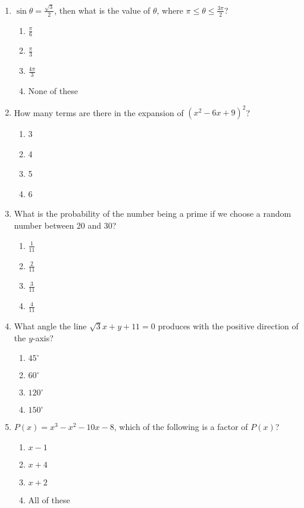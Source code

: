 \documentclass[12pt]{article}
\begin{document}
\begin{enumerate}
    \item $\sin\theta = \frac{\sqrt{3}}{2}$, then what is the value of $\theta$, where $\pi \leq \theta \leq \frac{3\pi}{2}$?
    \begin{enumerate}
        \item $\frac{\pi}{6}$
        \item $\frac{\pi}{3}$
        \item $\frac{4\pi}{3}$
        \item None of these
    \end{enumerate}

    \item How many terms are there in the expansion of $(x^2 - 6x + 9)^2$?
    \begin{enumerate}
        \item 3
        \item 4
        \item 5
        \item 6
    \end{enumerate}

    \item What is the probability of the number being a prime if we choose a random number between 20 and 30?
    \begin{enumerate}
        \item $\frac{1}{11}$
        \item $\frac{2}{11}$
        \item $\frac{3}{11}$
        \item $\frac{4}{11}$
    \end{enumerate}

    \item What angle the line $\sqrt{3}x + y + 11 = 0$ produces with the positive direction of the $y$-axis?
    \begin{enumerate}
        \item $45^\circ$
        \item $60^\circ$
        \item $120^\circ$
        \item $150^\circ$
    \end{enumerate}

    \item $P(x) = x^3 - x^2 - 10x - 8$, which of the following is a factor of $P(x)$?
    \begin{enumerate}
        \item $x - 1$
        \item $x + 4$
        \item $x + 2$
        \item All of these
    \end{enumerate}


\end{enumerate}
\end{document}
